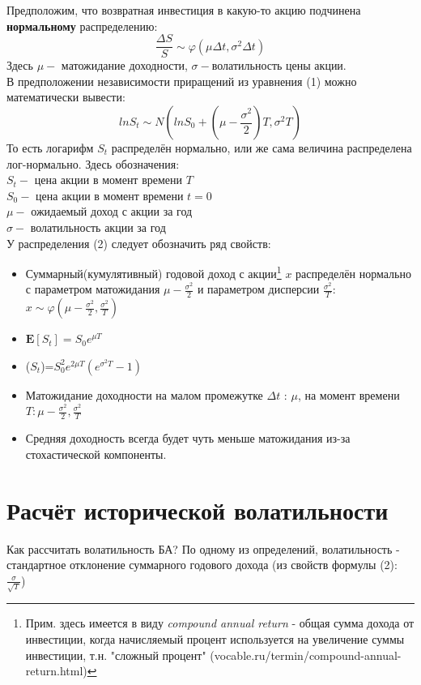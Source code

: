 \documentclass{article}
\begin{document}
Предположим, что возвратная инвестиция в какую-то акцию подчинена \textbf{нормальному} распределению:\\
\begin{equation}
    \frac{\Delta S}{S}\sim\varphi(\mu\Delta t, \sigma^{2}\Delta t)
\end{equation}
Здесь $\mu -$ матожидание доходности, $\sigma - $волатильность цены акции.\\
В предположении независимости приращений из уравнения (1) можно математически вывести:
\begin{equation}
    lnS_t\sim N(lnS_0+(\mu - \frac{\sigma^2}{2})T, \sigma^2T)
\end{equation}
То есть логарифм $S_t$ распределён нормально, или же сама величина распределена лог-нормально. Здесь обозначения:\\
$S_t -$ цена акции в момент времени $T$\\
$S_0 -$ цена акции в момент времени $t=0$\\
$\mu -$ ожидаемый доход с акции за год\\
$\sigma -$ волатильность акции за год\\
У распределения (2) следует обозначить ряд свойств:
\begin{itemize}
    \item Суммарный(кумулятивный) годовой доход с акции\footnote{Прим. здесь имеется в виду \textit{compound annual return} - общая сумма дохода от инвестиции, когда начисляемый процент используется на увеличение суммы инвестиции, т.н. "сложный процент" (vocable.ru/termin/compound-annual-return.html)} $x$ распределён нормально с параметром матожидания $\mu - \frac{\sigma^2}{2}$ и параметром дисперсии $\frac{\sigma^2}{T}$:\\
    $x\sim\varphi(\mu-\frac{\sigma^2}{2},\frac{\sigma^2}{T})$
    \item $\mathbf{E}[S_t] = S_0 e^{\mu T}$
    \item {}($S_t$)=$S_0^2e ^{2\mu T}(e^{\sigma^2 T}-1)$
    \item Матожидание доходности на малом промежутке $\Delta t$ : $\mu$, на момент времени $T: \mu-\frac{\sigma^2}{2},\frac{\sigma^2}{T}$
    \item Средняя доходность всегда будет чуть меньше матожидания из-за стохастической компоненты.
\end{itemize}

\section{Расчёт исторической волатильности}
Как рассчитать волатильность БА? По одному из определений, волатильность - стандартное отклонение суммарного годового дохода (из свойств формулы (2): $\frac{\sigma}{\sqrt{T}}$)
\end{document}

